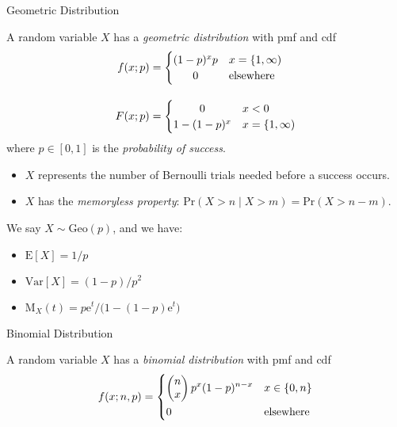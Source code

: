 \documentclass[8pt, handout]{beamer}
\renewcommand{\emph}[1]{\textcolor{defcol}{\textsl{#1}}}
\begin{document}
\begin{frame}{Geometric Distribution}

    A random variable \(X\) has a \emph{geometric distribution} with pmf and cdf
    \begin{align*}
        f(x;p) &= \begin{cases}
            (1 - p)^x p & x = \{ 1, \infty ) \\
            \hfil 0 & \text{elsewhere}
        \end{cases} \\[1em]
        F(x;p) &= \begin{cases}
            \hfil 0 & x < 0 \\
            1 - (1 - p)^x & x = \{ 1, \infty )
        \end{cases}
    \end{align*}
    where \(p \in [0,1]\) is the \emph{probability of success}.
    \begin{itemize}
        \item \(X\) represents the number of Bernoulli trials needed before a success occurs. 
        \item \(X\) has the \emph{memoryless property}: \(\mathrm{Pr}(X > n \;|\; X > m) = \mathrm{Pr}(X > n - m)\).
    \end{itemize}

    \vspace{2em}
    We say \(X \sim \mathrm{Geo}(p)\), and we have:
    \begin{itemize}
        \item \(\mathrm{E}[X] = 1/p\)
        \item \(\mathrm{Var}[X] = (1 - p)/p^2\)
        \item \(\mathrm{M}_X(t) = p \mathrm{e}^t / \Big( 1 - (1 - p)\mathrm{e}^t \Big)\)
    \end{itemize}

\end{frame}

\begin{frame}{Binomial Distribution}

    A random variable \(X\) has a \emph{binomial distribution} with pmf and cdf 
    \begin{align*}
        f(x;n,p) = \begin{dcases}
            \begin{pmatrix}
                n \\ x
            \end{pmatrix} p^x (1 - p)^{n - x} & x \in \{ 0, n \} \\
            0 & \text{elsewhere}
        \end{dcases}
    \end{align*}

\end{frame}
\end{document}
